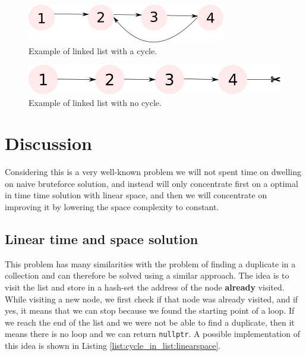 \begin{figure}
	\centering
	\includegraphics[scale=1.0]{sources/cycle_in_list/images/example1}
	\caption{Example of linked list with a cycle.}
	\label{fig:cycle_in_list:example1}
\end{figure}
\begin{figure}
	\label{fig:cycle_in_list:example2}
	\centering
	\includegraphics[scale=1.0]{sources/cycle_in_list/images/example2}
	\caption{Example of linked list with no cycle.}
\end{figure}

%
%	

\section{Discussion}
\label{cycle_in_list:sec:discussion}
Considering this is a very well-known problem we will not spent time on dwelling on naive bruteforce solution, and instead will only concentrate first on a optimal in time time solution with linear space, and then we will concentrate on improving it by lowering the space complexity to constant.

\subsection{Linear time and space solution}
\label{cycle_in_list:sec:bruteforce}
This problem has many similarities with the problem of finding a duplicate in a collection and can therefore be solved using a similar approach. The idea is to visit the list and store in a hash-set the  address of the node \textbf{already} visited. While visiting a new node, we first check if that node was already visited, and if yes, it means that we can stop because we found the starting point of a loop. If we reach the end of the list and we were not be able to find a duplicate, then it means there is no loop and we can return \lstinline[columns=fixed]{nullptr}.
A possible implementation of this idea is shown in Listing \ref{list:cycle_in_list:linearspace}.

